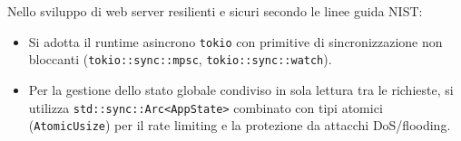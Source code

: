 \documentclass[11pt,a4paper]{article}
\begin{document}
\begin{altbox}
Nello sviluppo di web server resilienti e sicuri secondo le linee guida NIST:
\begin{itemize}
    \item Si adotta il runtime asincrono \texttt{tokio} con primitive di sincronizzazione non bloccanti (\texttt{tokio::sync::mpsc}, \texttt{tokio::sync::watch}).
    \item Per la gestione dello stato globale condiviso in sola lettura tra le richieste, si utilizza \texttt{std::sync::Arc<AppState>} combinato con tipi atomici (\texttt{AtomicUsize}) per il rate limiting e la protezione da attacchi DoS/flooding.
\end{itemize}
\end{altbox}
\end{document}
